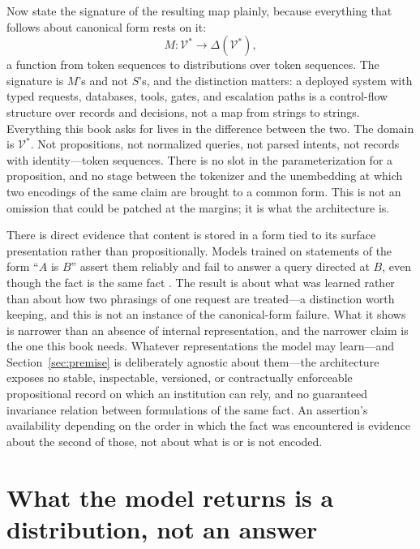 Now state the signature of the resulting map plainly, because everything that follows
about canonical form rests on it:
\begin{equation}
  M : \mathcal{V}^{*} \longrightarrow \Delta(\mathcal{V}^{*}),
  \label{eq:signature}
\end{equation}
a function from token sequences to distributions over token sequences. The signature is
$M$'s and not $S$'s, and the distinction matters: a deployed system with typed requests,
databases, tools, gates, and escalation paths is a control-flow structure over records and
decisions, not a map from strings to strings. Everything this book asks for lives in the
difference between the two. The domain
is $\mathcal{V}^{*}$. Not propositions, not normalized queries, not parsed
intents, not records with identity---token sequences. There is no slot in the
parameterization for a proposition, and no stage between the tokenizer and the
unembedding at which two encodings of the same claim are brought to a common form.
This is not an omission that could be patched at the margins; it is what the
architecture is.

There is direct evidence that content is stored in a form tied to its surface
presentation rather than propositionally. Models trained on statements of the form
``$A$ is $B$'' assert them reliably and fail to answer a query directed at $B$, even
though the fact is the same fact \citep{berglund2024}. The result is about what was
learned rather than about how two phrasings of one request are treated---a
distinction worth keeping, and this is not an instance of the canonical-form
failure. What it shows is narrower than an
absence of internal representation, and the narrower claim is the one this book needs.
Whatever representations the model may learn---and Section~\ref{sec:premise} is
deliberately agnostic about them---the architecture exposes no stable, inspectable,
versioned, or contractually enforceable propositional record on which an institution can
rely, and no guaranteed invariance relation between formulations of the same fact. An
assertion's availability depending on the order in which the fact was encountered is
evidence about the second of those, not about what is or is not encoded.

\section{What the model returns is a distribution, not an answer}
\label{sec:sampling}

